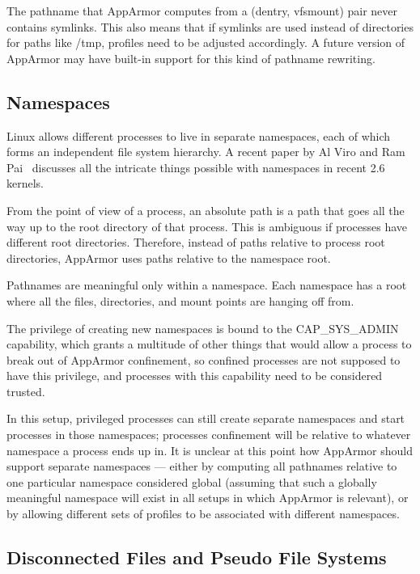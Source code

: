 \documentclass[a4paper]{article}
\renewcommand{\H}{\hspace{0pt}}
\begin{document}
The pathname that AppArmor computes from a (dentry, vfsmount) pair never
contains symlinks.  This also means that if symlinks are used instead of
directories for paths like /tmp, profiles need to be adjusted
accordingly.  A future version of AppArmor may have built-in support
for this kind of pathname rewriting.


\subsection{Namespaces}

Linux allows different processes to live in separate namespaces, each of
which forms an independent file system hierarchy.  A recent paper by Al
Viro and Ram Pai~\cite{ols06-pai} discusses all the intricate things
possible with namespaces in recent 2.6 kernels.

From the point of view of a process, an absolute path is a path that
goes all the way up to the root directory of that process.  This is
ambiguous if processes have different root directories.  Therefore,
instead of paths relative to process root directories, AppArmor uses
paths relative to the namespace root.

Pathnames are meaningful only within a namespace.  Each namespace has a
root where all the files, directories, and mount points are hanging off
from.

The privilege of creating new namespaces is bound to the
CAP\_{\H}SYS\_{\H}ADMIN capability, which grants a multitude of other
things that would allow a process to break out of AppArmor confinement,
so confined processes are not supposed to have this privilege, and
processes with this capability need to be considered trusted.

In this setup, privileged processes can still create separate namespaces
and start processes in those namespaces; processes confinement will be
relative to whatever namespace a process ends up in.  It is unclear
at this point how AppArmor should support separate namespaces --- either
by computing all pathnames relative to one particular namespace
considered global (assuming that such a globally meaningful namespace
will exist in all setups in which AppArmor is relevant), or by allowing
different sets of profiles to be associated with different namespaces.


\subsection{Disconnected Files and Pseudo File Systems}
\end{document}
